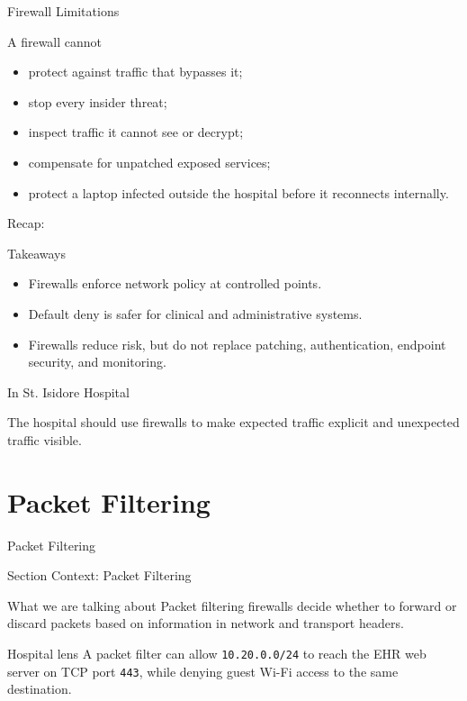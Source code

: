 \documentclass[presentation]{beamer}
\newcommand{\sectiontitleframe}[1]{
\begin{frame}[plain,c]
\begin{center}
{\usebeamerfont{title}\usebeamercolor[fg]{title}#1}
\end{center}
\end{frame}
}
\newcommand{\scenario}{St. Isidore Hospital}
\newcommand{\takeawaysframe}[2]{
\begin{frame}[c]{Recap: \insertsection}
\begin{block}{Takeaways}
#1
\end{block}
\begin{exampleblock}{In \scenario}
#2
\end{exampleblock}
\end{frame}
}
\begin{document}
\begin{frame}[c]{Firewall Limitations}
\begin{block}{A firewall cannot}
\begin{itemize}
    \item protect against traffic that bypasses it;
    \item stop every insider threat;
    \item inspect traffic it cannot see or decrypt;
    \item compensate for unpatched exposed services;
    \item protect a laptop infected outside the hospital before it reconnects internally.
\end{itemize}
\end{block}
\end{frame}

\takeawaysframe{
\begin{itemize}
    \item Firewalls enforce network policy at controlled points.
    \item Default deny is safer for clinical and administrative systems.
    \item Firewalls reduce risk, but do not replace patching, authentication, endpoint security, and monitoring.
\end{itemize}
}{
The hospital should use firewalls to make expected traffic explicit and unexpected traffic visible.
}

\section{Packet Filtering}
\sectiontitleframe{Packet Filtering}

\begin{frame}[c]{Section Context: Packet Filtering}
\begin{block}{What we are talking about}
Packet filtering firewalls decide whether to forward or discard packets based on information in
network and transport headers.
\end{block}

\begin{exampleblock}{Hospital lens}
A packet filter can allow \texttt{10.20.0.0/24} to reach the EHR web server on TCP port
\texttt{443}, while denying guest Wi-Fi access to the same destination.
\end{exampleblock}
\end{frame}
\end{document}

